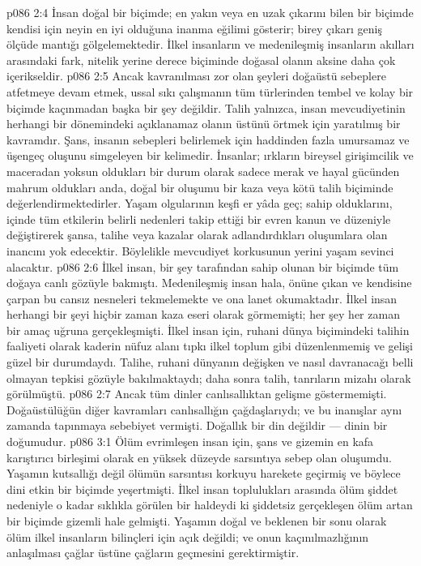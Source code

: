 \vs p086 2:4 İnsan doğal bir biçimde; en yakın veya en uzak çıkarını bilen bir biçimde kendisi için neyin en iyi olduğuna inanma eğilimi gösterir; birey çıkarı geniş ölçüde mantığı gölgelemektedir. İlkel insanların ve medenileşmiş insanların akılları arasındaki fark, nitelik yerine derece biçiminde doğasal olanın aksine daha çok içerikseldir.
\vs p086 2:5 Ancak kavranılması zor olan şeyleri doğaüstü sebeplere atfetmeye devam etmek, ussal sıkı çalışmanın tüm türlerinden tembel ve kolay bir biçimde kaçınmadan başka bir şey değildir. Talih yalnızca, insan mevcudiyetinin herhangi bir dönemindeki açıklanamaz olanın üstünü örtmek için yaratılmış bir kavramdır. Şans, insanın sebepleri belirlemek için haddinden fazla umursamaz ve üşengeç oluşunu simgeleyen bir kelimedir. İnsanlar; ırkların bireysel girişimcilik ve maceradan yoksun oldukları bir durum olarak sadece merak ve hayal gücünden mahrum oldukları anda, doğal bir oluşumu bir kaza veya kötü talih biçiminde değerlendirmektedirler. Yaşam olgularının keşfi er yâda geç; sahip olduklarını, içinde tüm etkilerin belirli nedenleri takip ettiği bir evren kanun ve düzeniyle değiştirerek şansa, talihe veya kazalar olarak adlandırdıkları oluşumlara olan inancını yok edecektir. Böylelikle mevcudiyet korkusunun yerini yaşam sevinci alacaktır.
\vs p086 2:6 İlkel insan, bir şey tarafından sahip olunan bir biçimde tüm doğaya canlı gözüyle bakmıştı. Medenileşmiş insan hala, önüne çıkan ve kendisine çarpan bu cansız nesneleri tekmelemekte ve ona lanet okumaktadır. İlkel insan herhangi bir şeyi hiçbir zaman kaza eseri olarak görmemişti; her şey her zaman bir amaç uğruna gerçekleşmişti. İlkel insan için, ruhani dünya biçimindeki talihin faaliyeti olarak kaderin nüfuz alanı tıpkı ilkel toplum gibi düzenlenmemiş ve gelişi güzel bir durumdaydı. Talihe, ruhani dünyanın değişken ve nasıl davranacağı belli olmayan tepkisi gözüyle bakılmaktaydı; daha sonra talih, tanrıların mizahı olarak görülmüştü.
\vs p086 2:7 Ancak tüm dinler canlısallıktan gelişme göstermemişti. Doğaüstülüğün diğer kavramları canlısallığın çağdaşlarıydı; ve bu inanışlar aynı zamanda tapınmaya sebebiyet vermişti. Doğallık bir din değildir --- dinin bir doğumudur.
\vs p086 3:1 Ölüm evrimleşen insan için, şans ve gizemin en kafa karıştırıcı birleşimi olarak en yüksek düzeyde sarsıntıya sebep olan oluşumdu. Yaşamın kutsallığı değil ölümün sarsıntısı korkuyu harekete geçirmiş ve böylece dini etkin bir biçimde yeşertmişti. İlkel insan toplulukları arasında ölüm şiddet nedeniyle o kadar sıklıkla görülen bir haldeydi ki şiddetsiz gerçekleşen ölüm artan bir biçimde gizemli hale gelmişti. Yaşamın doğal ve beklenen bir sonu olarak ölüm ilkel insanların bilinçleri için açık değildi; ve onun kaçınılmazlığının anlaşılması çağlar üstüne çağların geçmesini gerektirmiştir.
